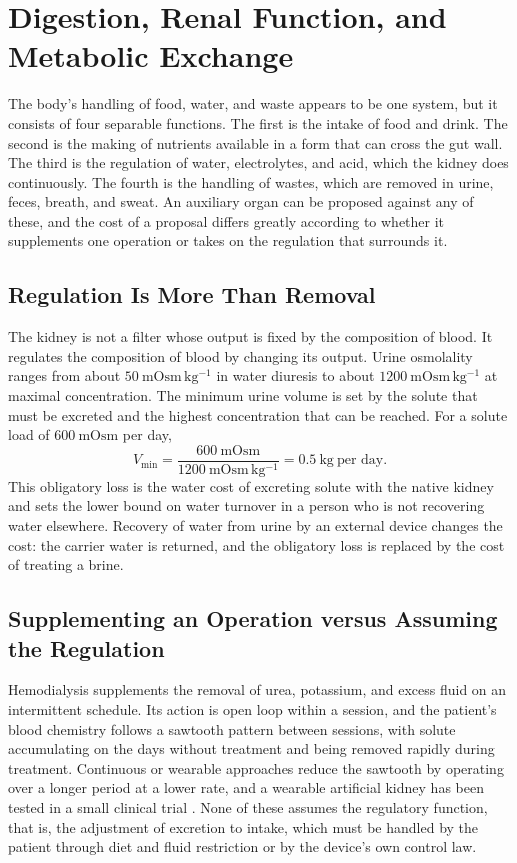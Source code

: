 \documentclass[11pt,openany]{book}
\theoremstyle{definition}
\theoremstyle{remark}
\begin{document}
\chapter{Digestion, Renal Function, and Metabolic Exchange}
\label{ch:renal}

The body's handling of food, water, and waste appears to be one system, but it consists of four separable functions. The first is the intake of food and drink. The second is the making of nutrients available in a form that can cross the gut wall. The third is the regulation of water, electrolytes, and acid, which the kidney does continuously. The fourth is the handling of wastes, which are removed in urine, feces, breath, and sweat. An auxiliary organ can be proposed against any of these, and the cost of a proposal differs greatly according to whether it supplements one operation or takes on the regulation that surrounds it.

\section{Regulation Is More Than Removal}

The kidney is not a filter whose output is fixed by the composition of blood. It regulates the composition of blood by changing its output. Urine osmolality ranges from about $50\ \mathrm{mOsm\,kg^{-1}}$ in water diuresis to about $1200\ \mathrm{mOsm\,kg^{-1}}$ at maximal concentration. The minimum urine volume is set by the solute that must be excreted and the highest concentration that can be reached. For a solute load of $600\ \mathrm{mOsm}$ per day,
\begin{equation}
V_{\min}=\frac{600\ \mathrm{mOsm}}{1200\ \mathrm{mOsm\,kg^{-1}}}=0.5\ \mathrm{kg}\ \text{per day}.
\label{eq:vmin}
\end{equation}
This obligatory loss is the water cost of excreting solute with the native kidney and sets the lower bound on water turnover in a person who is not recovering water elsewhere. Recovery of water from urine by an external device changes the cost: the carrier water is returned, and the obligatory loss is replaced by the cost of treating a brine.

\section{Supplementing an Operation versus Assuming the Regulation}

Hemodialysis supplements the removal of urea, potassium, and excess fluid on an intermittent schedule. Its action is open loop within a session, and the patient's blood chemistry follows a sawtooth pattern between sessions, with solute accumulating on the days without treatment and being removed rapidly during treatment. Continuous or wearable approaches reduce the sawtooth by operating over a longer period at a lower rate, and a wearable artificial kidney has been tested in a small clinical trial \cite{gura2016}. None of these assumes the regulatory function, that is, the adjustment of excretion to intake, which must be handled by the patient through diet and fluid restriction or by the device's own control law.
\end{document}
